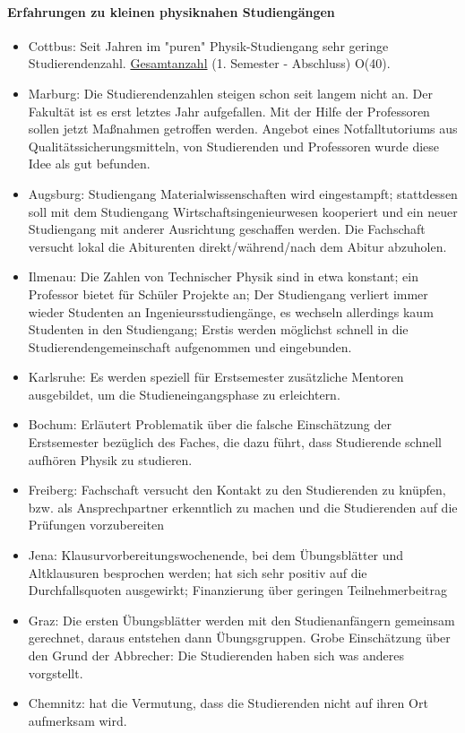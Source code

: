     \paragraph{Erfahrungen zu kleinen physiknahen Studiengängen}
      \begin{itemize}
        \item Cottbus: Seit Jahren im "puren" Physik-Studiengang sehr geringe Studierendenzahl. \underline{Gesamtanzahl} (1. Semester - Abschluss) O(40).
        \item Marburg: Die Studierendenzahlen steigen schon seit langem nicht an. Der Fakultät ist es erst letztes Jahr aufgefallen. Mit der Hilfe der Professoren sollen jetzt Maßnahmen getroffen werden. Angebot eines Notfalltutoriums aus Qualitätssicherungsmitteln, von Studierenden und Professoren wurde diese Idee als gut befunden.
        \item Augsburg: Studiengang Materialwissenschaften wird eingestampft; stattdessen soll mit dem Studiengang Wirtschaftsingenieurwesen kooperiert und ein neuer Studiengang mit anderer Ausrichtung geschaffen werden. Die Fachschaft versucht lokal die Abiturenten direkt/während/nach dem Abitur abzuholen.
        \item Ilmenau: Die Zahlen von Technischer Physik sind in etwa konstant; ein Professor bietet für Schüler Projekte an; Der Studiengang verliert immer wieder Studenten an Ingenieursstudiengänge, es wechseln allerdings kaum Studenten in den Studiengang; Erstis werden möglichst schnell in die Studierendengemeinschaft aufgenommen und eingebunden.
        \item Karlsruhe: Es werden speziell für Erstsemester zusätzliche Mentoren ausgebildet, um die Studieneingangsphase zu erleichtern.
        \item Bochum: Erläutert Problematik über die falsche Einschätzung der Erstsemester bezüglich des Faches, die dazu führt, dass Studierende schnell aufhören Physik zu studieren.
        \item Freiberg: Fachschaft versucht den Kontakt zu den Studierenden zu knüpfen, bzw. als Ansprechpartner erkenntlich zu machen und die Studierenden auf die Prüfungen vorzubereiten
        \item Jena: Klausurvorbereitungswochenende, bei dem Übungsblätter und Altklausuren besprochen werden; hat sich sehr positiv auf die Durchfallsquoten ausgewirkt; Finanzierung über geringen Teilnehmerbeitrag
        \item Graz: Die ersten Übungsblätter werden mit den Studienanfängern gemeinsam gerechnet, daraus entstehen dann Übungsgruppen. Grobe Einschätzung über den Grund der Abbrecher: Die Studierenden haben sich was anderes vorgstellt.
        \item Chemnitz: hat die Vermutung, dass die Studierenden nicht auf ihren Ort aufmerksam wird.
      \end{itemize}

